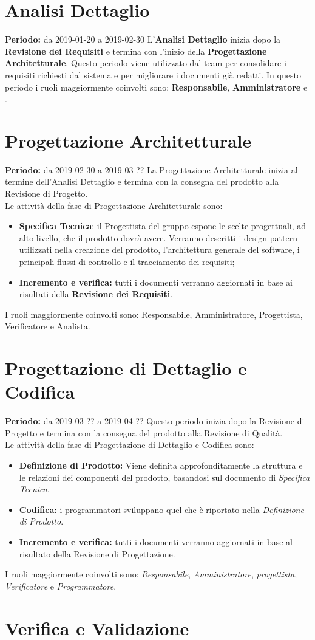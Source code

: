 \section{Analisi Dettaglio}
\textbf{Periodo:} da 2019-01-20 a 2019-02-30
L'\textbf{Analisi Dettaglio} inizia dopo la \textbf{Revisione dei Requisiti} e termina con l’inizio della \textbf{Progettazione Architetturale}.
Questo periodo viene utilizzato dal team per consolidare i requisiti richiesti dal sistema e per migliorare i documenti già redatti.
In questo periodo i ruoli maggiormente coinvolti sono: \textbf{Responsabile}, \textbf{Amministratore} e .

\section{Progettazione Architetturale}
\textbf{Periodo:} da 2019-02-30 a 2019-03-??
La Progettazione Architetturale inizia al termine dell’Analisi Dettaglio e termina con la consegna del prodotto alla Revisione di Progetto.\\Le attività della fase di Progettazione Architetturale sono:
\begin{itemize}
    \item \textbf{Specifica Tecnica}: il Progettista del gruppo espone le scelte progettuali, ad alto livello, che il prodotto dovrà avere. Verranno descritti i design pattern utilizzati nella creazione del prodotto, l’architettura generale del software, i principali flussi di controllo e il tracciamento dei requisiti;
    \item \textbf{Incremento e verifica:} tutti i documenti verranno aggiornati in base ai risultati della \textbf{Revisione dei Requisiti}. 
\end{itemize}
I ruoli maggiormente coinvolti sono: Responsabile, Amministratore, Progettista, Verificatore e Analista.

\section{Progettazione di Dettaglio e Codifica}
\textbf{Periodo:} da 2019-03-?? a 2019-04-??
Questo periodo inizia dopo la Revisione di Progetto e termina con la consegna del prodotto alla Revisione di Qualità.\\Le attività della fase di Progettazione di Dettaglio e Codifica sono:
\begin{itemize}
    \item \textbf{Definizione di Prodotto:} Viene definita approfonditamente la struttura e le relazioni dei componenti del prodotto, basandosi sul documento di \textit{Specifica Tecnica}.
    \item \textbf{Codifica:} i programmatori sviluppano quel che è riportato nella \textit{Definizione di Prodotto}. 
    \item \textbf{Incremento e verifica:} tutti i documenti verranno aggiornati in base al risultato della Revisione di Progettazione.
\end{itemize}
I ruoli maggiormente coinvolti sono: \textit{Responsabile}, \textit{Amministratore}, \textit{progettista}, \textit{Verificatore} e \textit{Programmatore}.

\section{Verifica e Validazione}
